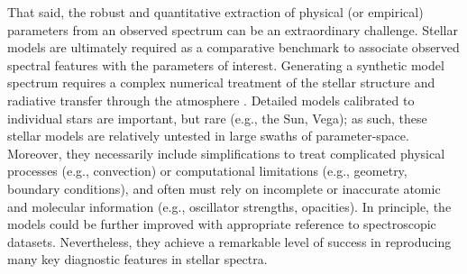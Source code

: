 \documentclass[iop,floatfix]{emulateapj}
\begin{document}
That said, the robust and quantitative extraction of physical (or empirical) parameters from an 
observed spectrum can be an extraordinary challenge.  Stellar models are ultimately required as a 
comparative benchmark to associate observed spectral features with the parameters of interest.  
Generating a synthetic model spectrum requires a complex numerical treatment of the stellar 
structure and radiative transfer through the atmosphere \citep[e.g.,][]{kurucz93,castelli04,
hauschildt99,husser13,paxton11}.  Detailed models calibrated to individual stars are important, but 
rare (e.g., the Sun, Vega); as such, these stellar models are relatively untested in large swaths 
of parameter-space.  Moreover, they necessarily include simplifications to treat complicated 
physical processes (e.g., convection) or computational limitations (e.g., geometry, boundary 
conditions), and often must rely on incomplete or inaccurate atomic and molecular information 
(e.g., oscillator strengths, opacities).  In principle, the models could be further improved with 
appropriate reference to spectroscopic datasets.  Nevertheless, they achieve a remarkable level of 
success in reproducing many key diagnostic features in stellar spectra.  
\end{document}
